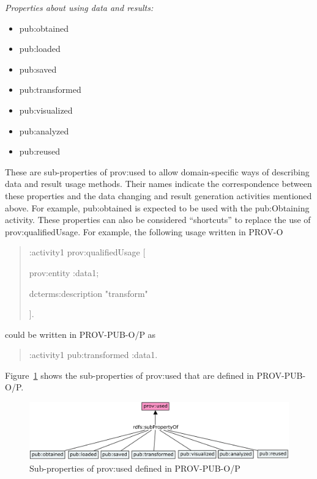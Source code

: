 {\noindent\emph{Properties about using data and results:}}
\begin{itemize}
	\item pub:obtained
	\item pub:loaded
	\item pub:saved
	\item pub:transformed%
	\item pub:visualized
	\item pub:analyzed
	\item pub:reused
\end{itemize}
These are sub-properties of prov:used to allow domain-specific ways of describing data and result usage methods. Their names indicate the correspondence between these properties and the data changing and result generation activities mentioned above. For example, pub:obtained is expected to be used with the pub:Obtaining activity. These properties can also be considered ``shortcuts'' to replace the use of prov:qualifiedUsage. For example, the following usage written in PROV-O
\begin{quotation}
:activity1 prov:qualifiedUsage [

  \hspace{2em}prov:entity :data1;
  
  \hspace{2em}dcterms:description "transform"

].
\end{quotation}
could be written in PROV-PUB-O/P as
\begin{quotation}
:activity1 pub:transformed :data1.
\end{quotation}
Figure~\ref{fig:prov-pub-p-usage} shows the sub-properties of prov:used that are defined in PROV-PUB-O/P.
\begin{figure}
	\includegraphics[width=\textwidth]{model/ontology/prov-pub/prov-pub-p-usage.png}
	\caption{Sub-properties of prov:used defined in PROV-PUB-O/P}
	\label{fig:prov-pub-p-usage}
\end{figure}

